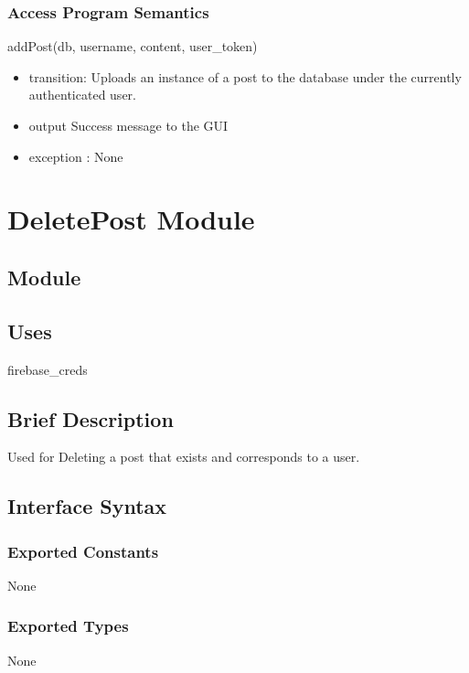 \documentclass[12pt, titlepage]{article}
\begin{document}
\subsubsection{Access Program Semantics}
addPost(db, username, content, user\_token)
\begin{itemize}
    \item transition: Uploads an instance of a post to the database under the currently authenticated user.
    \item output Success message to the GUI
    \item exception : None
\end{itemize}











\newpage
\section* {DeletePost Module}

\subsection*{Module}

\subsection* {Uses}
firebase\_creds

\subsection* {Brief Description}
Used for Deleting a post that exists and corresponds to a user.

\subsection* {Interface Syntax}
\subsubsection* {Exported Constants}
None

\subsubsection* {Exported Types}
None
\end{document}
